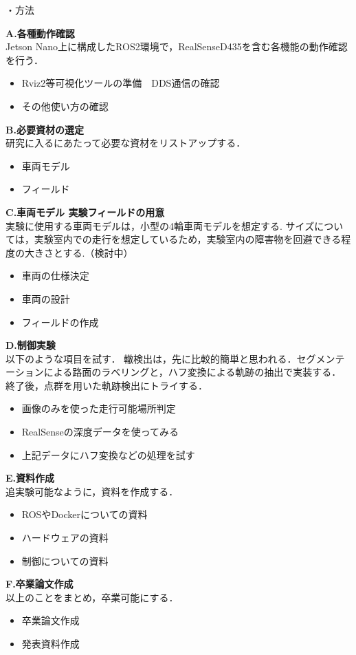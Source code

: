 \documentclass[a4paper]{jarticle}
\begin{document}
%
・方法{
\textbf{A.各種動作確認\\}
Jetson Nano上に構成したROS2環境で，RealSenseD435を含む各機能の動作確認を行う．

\begin{itemize}
	\item Rviz2等可視化ツールの準備　DDS通信の確認
	\item その他使い方の確認
\end{itemize}

\textbf{B.必要資材の選定\\}
研究に入るにあたって必要な資材をリストアップする．

\begin{itemize}
	\item 車両モデル
	\item フィールド
\end{itemize}

\textbf{C.車両モデル 実験フィールドの用意\\}
実験に使用する車両モデルは，小型の4輪車両モデルを想定する.
サイズについては，実験室内での走行を想定しているため，実験室内の障害物を回避できる程度の大きさとする.（検討中）

\begin{itemize}
	\item 車両の仕様決定
	\item 車両の設計
	\item フィールドの作成
\end{itemize}

\textbf{D.制御実験\\}
以下のような項目を試す．
轍検出は，先に比較的簡単と思われる．セグメンテーションによる路面のラベリングと，ハフ変換による軌跡の抽出で実装する．
終了後，点群を用いた軌跡検出にトライする．

\begin{itemize}
	\item 画像のみを使った走行可能場所判定
	\item RealSenseの深度データを使ってみる
	\item 上記データにハフ変換などの処理を試す
\end{itemize}

\textbf{E.資料作成\\}
追実験可能なように，資料を作成する．

\begin{itemize}
	\item ROSやDockerについての資料
	\item ハードウェアの資料
	\item 制御についての資料
\end{itemize}

\textbf{F.卒業論文作成\\}
以上のことをまとめ，卒業可能にする．

\begin{itemize}
	\item 卒業論文作成
	\item 発表資料作成
\end{itemize}
}
\end{document}
